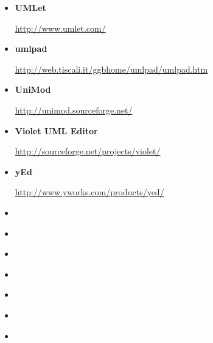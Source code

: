 \begin{itemize}
\item {\bf UMLet}
\par \noindent \url{http://www.umlet.com/}

\item {\bf umlpad}
\par \noindent \url{http://web.tiscali.it/ggbhome/umlpad/umlpad.htm}

\item {\bf UniMod}
\par \noindent \url{http://unimod.sourceforge.net/}

\item {\bf Violet UML Editor}
\par \noindent \url{http://sourceforge.net/projects/violet/}

\item {\bf yEd}
\par \noindent \url{http://www.yworks.com/products/yed/}

\item {\bf }
\par \noindent \url{}

\item {\bf }
\par \noindent \url{}

\item {\bf }
\par \noindent \url{}

\item {\bf }
\par \noindent \url{}

\item {\bf }
\par \noindent \url{}

\item {\bf }
\par \noindent \url{}

\item {\bf }
\par \noindent \url{}

\end{itemize}